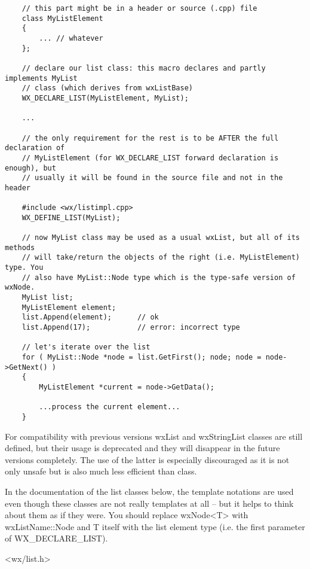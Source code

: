 \begin{verbatim}
    // this part might be in a header or source (.cpp) file
    class MyListElement
    {
        ... // whatever
    };

    // declare our list class: this macro declares and partly implements MyList
    // class (which derives from wxListBase)
    WX_DECLARE_LIST(MyListElement, MyList);

    ...

    // the only requirement for the rest is to be AFTER the full declaration of
    // MyListElement (for WX_DECLARE_LIST forward declaration is enough), but
    // usually it will be found in the source file and not in the header

    #include <wx/listimpl.cpp>
    WX_DEFINE_LIST(MyList);

    // now MyList class may be used as a usual wxList, but all of its methods
    // will take/return the objects of the right (i.e. MyListElement) type. You
    // also have MyList::Node type which is the type-safe version of wxNode.
    MyList list;
    MyListElement element;
    list.Append(element);      // ok
    list.Append(17);           // error: incorrect type

    // let's iterate over the list
    for ( MyList::Node *node = list.GetFirst(); node; node = node->GetNext() )
    {
        MyListElement *current = node->GetData();

        ...process the current element...
    }
\end{verbatim}

For compatibility with previous versions wxList and wxStringList classes are
still defined, but their usage is deprecated and they will disappear in the
future versions completely. The use of the latter is especially discouraged as
it is not only unsafe but is also much less efficient than 
 class.

In the documentation of the list classes below, the template notations are
used even though these classes are not really templates at all -- but it helps
to think about them as if they were. You should replace wxNode<T> with
wxListName::Node and T itself with the list element type (i.e. the first
parameter of WX\_DECLARE\_LIST).




<wx/list.h>

